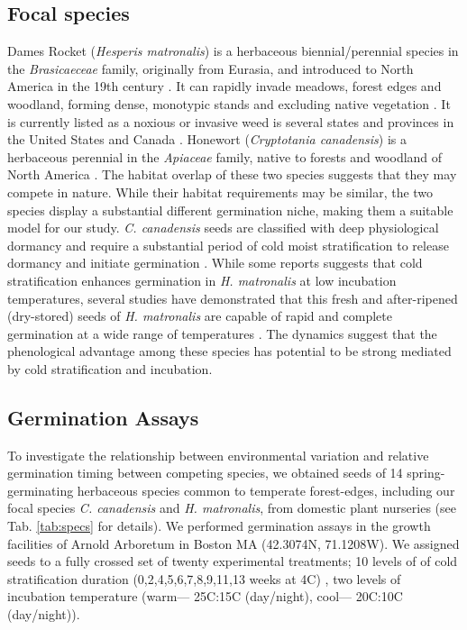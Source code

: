 \documentclass{article}\usepackage[]{graphicx}\usepackage[]{color}
\begin{document}
\subsection{Focal species}
 Dames Rocket (\textit{Hesperis matronalis}) is a herbaceous biennial/perennial species in the \textit{Brasicaeceae} family, originally from Eurasia, and introduced to North America in the 19th century \citep{Francis:2009wz}. It  can rapidly invade  meadows, forest edges and woodland, forming dense, monotypic stands and excluding native vegetation \citep{Francis:2009wz}. It is currently listed as a noxious or invasive weed is several states and provinces in the United States and Canada \citep{Susko:2008ut}. Honewort (\textit{Cryptotania canadensis}) is a herbaceous perennial in the \textit{Apiaceae} family, native to forests and woodland of North America \citep{Hawkins:2007vb}. The  habitat overlap of these two species suggests that they may compete in nature. While their habitat requirements may be similar, the two species display a substantial different germination niche, making them a suitable model for our study. \textit{C. canadensis} seeds are classified with deep physiological dormancy and require a substantial period of cold moist stratification to release dormancy and initiate germination \citep{Baskin:1988um}. While some reports suggests that cold stratification enhances germination in \textit{H. matronalis} at low incubation temperatures, several studies have demonstrated that this fresh and after-ripened (dry-stored) seeds of \textit{H. matronalis} are capable of rapid and complete germination at a wide range of  temperatures \citep{Susko:2008ut}. The dynamics suggest that the phenological advantage among these species has potential to be strong mediated by cold stratification and incubation.  

\subsection{Germination Assays}

To investigate the relationship between environmental variation and relative germination timing between competing species, we obtained seeds of 14 spring-germinating herbaceous species common to temperate forest-edges, including our focal species  \textit{C. canadensis} and \textit{H. matronalis}, from domestic plant nurseries (see Tab. \ref{tab:specs} for details). We performed germination assays in the growth facilities of Arnold Arboretum in Boston MA (42.3074\degree N, 71.1208\degree W). We assigned seeds to a fully crossed set of twenty experimental treatments; 10 levels of of cold stratification duration (0,2,4,5,6,7,8,9,11,13 weeks at 4\degree C) , two levels of incubation temperature (warm--- 25\degree C:15\degree C (day/night), cool--- 20\degree C:10\degree C (day/night)).
\end{document}
